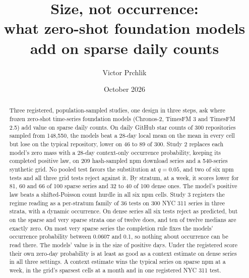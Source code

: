 \documentclass[10pt]{article}
\title{Size, not occurrence:\\what zero-shot foundation models add on sparse daily counts}
\author{Victor Prchlik}
\date{October 2026 \\ \small \reportdoi}
\begin{document}
\maketitle

\begin{abstract}
Three registered, population-sampled studies, one design in three steps, ask where frozen zero-shot
time-series foundation models (Chronos-2, TimesFM 3 and TimesFM 2.5) add value on sparse daily counts. On
daily GitHub star counts of 300 repositories sampled from 148,550, the models beat a 28-day local mean on the
mean in every cell but lose on the typical repository, lower on 46 to 89 of 300. Study 2 replaces each model's
zero mass with a 28-day context-only occurrence probability, keeping its completed positive law, on 209
hash-sampled npm download series and a 540-series synthetic grid. No pooled test favors the substitution at
$q = 0.05$, and two of six npm tests and all three grid tests reject against it. By stratum, at a week, it
scores lower for 81, 60 and 66 of 100 sparse series and 32 to 40 of 100 dense ones. The model's positive law
beats a shifted-Poisson count hurdle in all six npm cells. Study 3 registers the regime reading as a
per-stratum family of 36 tests on 300 NYC 311 series in three strata, with a dynamic occurrence. On dense
series all six tests reject as predicted, but on the sparse and very sparse strata one of twelve does, and ten
of twelve medians are exactly zero. On most very sparse series the completion rule fixes the models'
occurrence probability between 0.0607 and 0.1, so nothing about occurrence can be read there. The models'
value is in the size of positive days. Under the registered score their own zero-day probability is at least
as good as a context estimate on dense series in all three settings. A context estimate wins the typical
series on sparse npm at a week, in the grid's sparsest cells at a month and in one registered NYC 311 test.
\end{abstract}
















\end{document}
